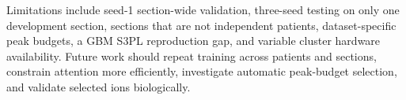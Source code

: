Limitations include seed-1 section-wide validation, three-seed testing on only
one development section, sections that are not independent patients,
dataset-specific peak budgets, a GBM S3PL reproduction gap, and variable
cluster hardware availability. Future work should repeat training across
patients and sections, constrain attention more efficiently, investigate
automatic peak-budget selection, and validate selected ions biologically.
